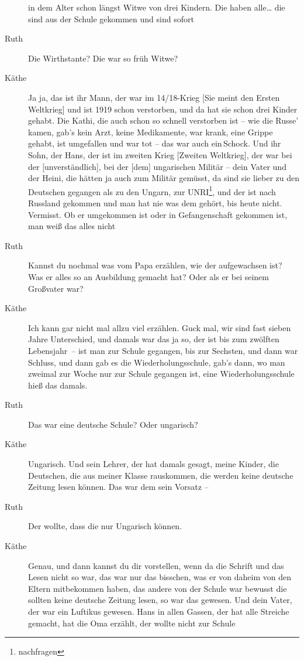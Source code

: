 \documentclass[ngerman,]{article}
\begin{document}
\begin{multicols}{3}
\begin{description}
in dem Alter schon längst Witwe von drei Kindern. Die haben alle\ldots{}
die sind aus der Schule gekommen und sind sofort
\item[Ruth]
Die Wirthstante? Die war so früh Witwe?
\item[Käthe]
Ja ja, das ist ihr Mann, der war im 14/18-Krieg {[}Sie meint den Ersten
Weltkrieg{]} und ist 1919 schon verstorben, und da hat sie schon drei
Kinder gehabt. Die Kathi, die auch schon so schnell verstorben ist – wie
die Russe' kamen, gab's kein Arzt, keine Medikamente, war krank, eine
Grippe gehabt, ist umgefallen und war tot – das war auch ein\,Schock.
Und ihr Sohn, der Hans, der ist im zweiten Krieg {[}Zweiten
Weltkrieg{]}, der war bei der {[}unverständlich{]}, bei der {[}dem{]}
ungarischen Militär – dein Vater und der Heini, die hätten ja auch zum
Militär gemüsst, da sind sie lieber zu den Deutschen gegangen als zu den
Ungarn, zur UNRI\footnote{nachfragen}, und der ist nach Russland
gekommen und man hat nie was dem gehört, bis heute nicht. Vermisst. Ob
er umgekommen ist oder in Gefangenschaft gekommen ist, man weiß das
alles nicht
\item[Ruth]
Kannst du nochmal was vom Papa erzählen, wie der aufgewachsen ist? Was
er alles so an Ausbildung gemacht hat? Oder als er bei seinem Großvater
war?
\item[Käthe]
Ich kann gar nicht mal allzu viel erzählen. Guck mal, wir sind fast
sieben Jahre Unterschied, und damals war das ja so, der ist bis zum
zwölften Lebensjahr~– ist man zur Schule gegangen, bis zur Sechsten, und
dann war Schluss, und dann gab es die Wiederholungsschule, gab's dann,
wo man zweimal zur Woche nur zur Schule gegangen ist, eine
Wiederholungsschule hieß das damals.
\item[Ruth]
Das war eine deutsche Schule? Oder ungarisch?
\item[Käthe]
Ungarisch. Und sein Lehrer, der hat damals gesagt, meine Kinder, die
Deutschen, die aus meiner Klasse rauskommen, die werden keine deutsche
Zeitung lesen können. Das war dem sein Vorsatz –
\item[Ruth]
Der wollte, dass die nur Ungarisch können.
\item[Käthe]
Genau, und dann kannst du dir vorstellen, wenn da die Schrift und das
Lesen nicht so war, das war nur das bisschen, was er von daheim von
den\,Eltern mitbekommen haben, das andere von der Schule war bewusst die
sollten keine deutsche Zeitung lesen, so war das gewesen. Und dein
Vater, der war ein Luftikus gewesen. Hans in allen Gassen, der hat alle
Streiche gemacht, hat die Oma erzählt, der wollte nicht zur Schule

\end{description}
\end{multicols}
\end{document}
